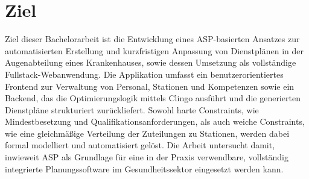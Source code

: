 \section{Ziel}
\label{sec:introduction:objectives}
Ziel dieser Bachelorarbeit ist die Entwicklung eines ASP-basierten Ansatzes zur automatisierten Erstellung und kurzfristigen Anpassung von Dienstplänen in der Augenabteilung eines Krankenhauses, sowie dessen Umsetzung als vollständige Fullstack-Webanwendung. Die Applikation umfasst ein benutzerorientiertes Frontend zur Verwaltung von Personal, Stationen und Kompetenzen sowie ein Backend, das die Optimierungslogik mittels Clingo ausführt und die generierten Dienstpläne strukturiert zurückliefert. Sowohl harte Constraints, wie Mindestbesetzung und Qualifikationsanforderungen, als auch weiche Constraints, wie eine gleichmäßige Verteilung der Zuteilungen zu Stationen, werden dabei formal modelliert und automatisiert gelöst. Die Arbeit untersucht damit, inwieweit ASP als Grundlage für eine in der Praxis verwendbare, vollständig integrierte Planungssoftware im Gesundheitssektor eingesetzt werden kann.






